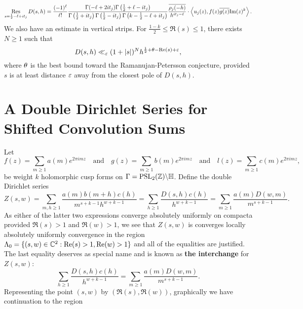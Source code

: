 \documentclass[12pt,reqno,oneside]{amsart}
\begin{document}
  \begin{equation}\label{equ:residue_of_shifted_Dirichlet}
    \operatorname*{\mathrm{Res}}_{s = \frac{1}{2}-\ell+it_{j}}D(s,h) = \frac{(-1)^{\ell}}{\ell!}\frac{\Gamma(-\ell+2it_{j})\Gamma\left(\frac{1}{2}+\ell-it_{j}\right)}{\Gamma\left(\frac{1}{2}+it_{j}\right)\Gamma\left(\frac{1}{2}-it_{j}\right)\Gamma\left(k-\frac{1}{2}-\ell+it_{j}\right)}\frac{\overline{\rho_{j}(-h)}}{h^{it_{j}-\ell}} \cdot \left\langle u_{j}(z),f(z)\overline{g(z)}\mathrm{Im}(z)^{k}\right\rangle.
  \end{equation}
  We also have an estimate in vertical strips. For $\frac{1-k}{2} \le \Re(s) \le 1$, there exists $N \ge 1$ such that
  \begin{equation}\label{equ:vertical_bound_shifted_Dirichlet_2}
    D(s,h) \ll_{\varepsilon} (1+|s|)^{N}h^{\frac{1}{2}+\theta-\mathrm{Re}(s)+\varepsilon},
  \end{equation}
  where $\theta$ is the best bound toward the Ramanujan-Petersson conjecture, provided $s$ is at least distance $\varepsilon$ away from the closest pole of $D(s,h)$.
\section{A Double Dirichlet Series for Shifted Convolution Sums}
  Let
  \[
    f(z) = \sum_{m \ge 1}a(m)e^{2\pi imz} \quad \text{and} \quad g(z) = \sum_{m \ge 1}b(m)e^{2\pi imz} \quad \text{and} \quad l(z) = \sum_{m \ge 1}c(m)e^{2\pi imz},
  \]
  be weight $k$ holomorphic cusp forms on $\Gamma = \mathrm{PSL}_{2}(\mathbb{Z})\backslash\mathbb{H}$. Define the double Dirichlet series
  \[
    Z(s,w) = \sum_{m,h \ge 1}\frac{a(m)b(m+h)c(h)}{m^{s+k-1}h^{w+k-1}} = \sum_{h \ge 1}\frac{D(s,h)c(h)}{h^{w+k-1}} = \sum_{m \ge 1}\frac{a(m)D(w,m)}{m^{s+k-1}}.
  \]
  As either of the latter two expressions converge absolutely uniformly on compacta provided $\Re(s) > 1$ and $\Re(w) > 1$, we see that $Z(s,w)$ is converges locally absolutely uniformly convergence in the region $\Lambda_{0} = \{(s,w) \in \mathbb{C}^{2}:\mathrm{Re}(s) > 1, \mathrm{Re}(w) > 1\}$ and all of the equalities are justified. The last equality deserves as special name and is known as \textbf{the interchange} for $Z(s,w)$:
  \[
    \sum_{h \ge 1}\frac{D(s,h)c(h)}{h^{w+k-1}} = \sum_{m \ge 1}\frac{a(m)D(w,m)}{m^{s+k-1}}.
  \]
  Representing the point $(s,w)$ by $(\Re(s),\Re(w))$, graphically we have continuation to the region

  \begin{center}
  \end{center}
\end{document}
